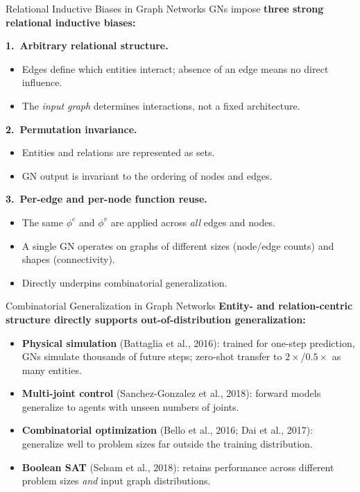 \documentclass[10pt]{beamer}
\begin{document}
\begin{frame}{Relational Inductive Biases in Graph Networks}
GNs impose \textbf{three strong relational inductive biases:}

\vspace{0.3cm}
\textbf{1.\ Arbitrary relational structure.}
\begin{itemize}
    \item Edges define which entities interact; absence of an edge means no direct influence.
    \item The \emph{input graph} determines interactions, not a fixed architecture.
\end{itemize}

\vspace{0.3cm}
\textbf{2.\ Permutation invariance.}
\begin{itemize}
    \item Entities and relations are represented as sets.
    \item GN output is invariant to the ordering of nodes and edges.
\end{itemize}

\vspace{0.3cm}
\textbf{3.\ Per-edge and per-node function reuse.}
\begin{itemize}
    \item The same $\phi^e$ and $\phi^v$ are applied across \emph{all} edges and nodes.
    \item A single GN operates on graphs of different sizes (node/edge counts) and shapes (connectivity).
    \item Directly underpins combinatorial generalization.
\end{itemize}
\end{frame}

\begin{frame}{Combinatorial Generalization in Graph Networks}
\textbf{Entity- and relation-centric structure directly supports out-of-distribution generalization:}

\begin{itemize}
    \item \textbf{Physical simulation} (Battaglia et al., 2016): trained for one-step prediction,
    GNs simulate thousands of future steps; zero-shot transfer to $2\times$/$0.5\times$ as many entities.
    \item \textbf{Multi-joint control} (Sanchez-Gonzalez et al., 2018): forward models
    generalize to agents with unseen numbers of joints.
    \item \textbf{Combinatorial optimization} (Bello et al., 2016; Dai et al., 2017):
    generalize well to problem sizes far outside the training distribution.
    \item \textbf{Boolean SAT} (Selsam et al., 2018): retains performance across different
    problem sizes \emph{and} input graph distributions.
\end{itemize}

\end{frame}
\end{document}
